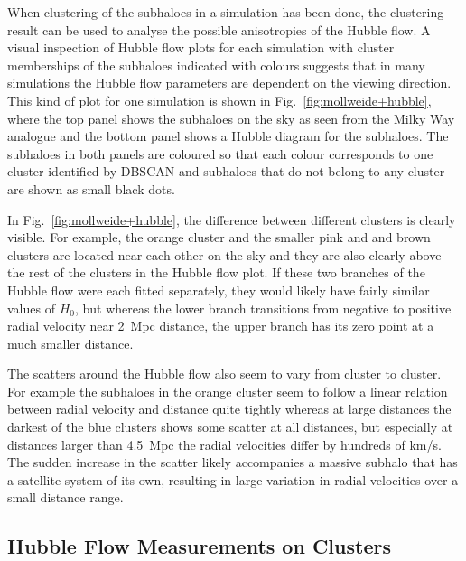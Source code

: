 \documentclass[english, twoside]{HYgradu}
\begin{document}
When clustering of the subhaloes in a simulation has been done, the clustering result can be used to analyse the possible anisotropies of the Hubble flow. A visual inspection of Hubble flow plots for each simulation with cluster memberships of the subhaloes indicated with colours suggests that in many simulations the Hubble flow parameters are dependent on the viewing direction. This kind of plot for one simulation is shown in Fig.~\ref{fig:mollweide+hubble}, where the top panel shows the subhaloes on the sky as seen from the Milky Way analogue and the bottom panel shows a Hubble diagram for the subhaloes. The subhaloes in both panels are coloured so that each colour corresponds to one cluster identified by DBSCAN and subhaloes that do not belong to any cluster are shown as small black dots. 

In Fig.~\ref{fig:mollweide+hubble}, the difference between different clusters is clearly visible. For example, the orange cluster and the smaller pink and and brown clusters are located near each other on the sky and they are also clearly above the rest of the clusters in the Hubble flow plot. If these two branches of the Hubble flow were each fitted separately, they would likely have fairly similar values of $H_0$, but whereas the lower branch transitions from negative to positive radial velocity near 2~Mpc distance, the upper branch has its zero point at a much smaller distance.

The scatters around the Hubble flow also seem to vary from cluster to cluster. For example the subhaloes in the orange cluster seem to follow a linear relation between radial velocity and distance quite tightly whereas at large distances the darkest of the blue clusters shows some scatter at all distances, but especially at distances larger than 4.5~Mpc the radial velocities differ by hundreds of km/s. The sudden increase in the scatter likely accompanies a massive subhalo that has a satellite system of its own, resulting in large variation in radial velocities over a small distance range.


\subsection{Hubble Flow Measurements on Clusters} \label{sect:clustermeasurements}
\end{document}
